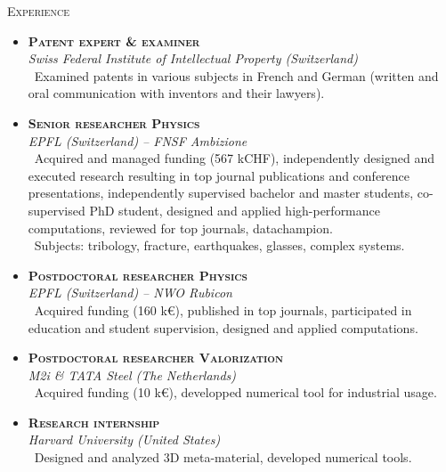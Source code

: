 \documentclass[11pt, a4paper]{article}
\newcommand{\dates}[1]{\hfill\mbox{\textbf{#1}}} %
\newcommand{\smaller}[1]{{\small\ #1}}
\newcommand{\headright}[1]{
    \vspace*{1.5ex}\textsc{\Large\color{cvblue}#1}\par%
    \vspace*{-2ex}{\color{cvblue}\hrulefill}\par
}
\begin{document}
\begin{minipage}[t]{0.56\textwidth}
    \hypersetup{urlcolor = cvblue, linkcolor = cvblue}

    \setlength{\parskip}{0.8ex}%

    \vspace{2ex}

    \headright{Experience}

    \begin{itemize}
        \item
        \textbf{\textsc{Patent expert \& examiner}} \dates{\MyDateIPI} \\
        \textit{Swiss Federal Institute of Intellectual Property (Switzerland)} \\
        \smaller{Examined patents in various subjects in French and German (written and oral communication with inventors and their lawyers).}
        \item
        \textbf{\textsc{Senior researcher Physics}} \dates{\MyDateAmbizione} \\
        \textit{EPFL (Switzerland) -- FNSF Ambizione} \\
        \smaller{Acquired and managed funding (567 kCHF), independently designed and executed research resulting in top journal publications and conference presentations, independently supervised bachelor and master students, co-supervised PhD student, designed and applied high-performance computations, reviewed for top journals, datachampion.} \\
        \smaller{Subjects: tribology, fracture, earthquakes, glasses, complex systems.}
        \item
        \textbf{\textsc{Postdoctoral researcher Physics}} \dates{\MyDateRubicon} \\
        \textit{EPFL (Switzerland) -- NWO Rubicon} \\
        \smaller{Acquired funding (160 k\euro), published in top journals, participated in education and student supervision, designed and applied computations.}
        \item
        \textbf{\textsc{Postdoctoral researcher Valorization}} \dates{\MyDateValorization} \\
        \textit{M2i \& TATA Steel (The Netherlands)} \\
        \smaller{Acquired funding (10 k\euro), developped numerical tool for industrial usage.}
        \item
        \textbf{\textsc{Research internship}} \dates{\MyDateHarvard} \\
        \textit{Harvard University (United States)} \\
        \smaller{Designed and analyzed 3D meta-material, developed numerical tools.}
    \end{itemize}


\end{minipage}
\end{document}
